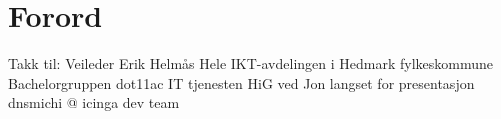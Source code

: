 \chapter*{Forord}
	Takk til:
    Veileder Erik Helmås
    Hele IKT-avdelingen i Hedmark fylkeskommune
    Bachelorgruppen dot11ac
    IT tjenesten HiG ved Jon langset for presentasjon
    dnsmichi @ icinga dev team


